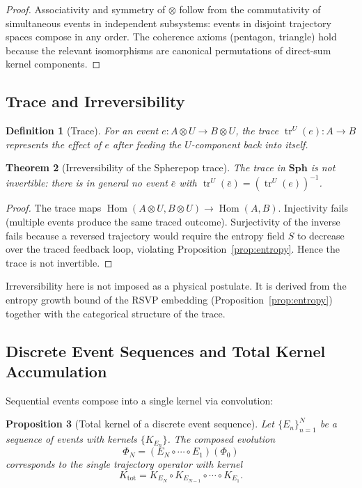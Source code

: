 \documentclass[12pt]{article}
\newtheorem{theorem}{Theorem}[section]
\newtheorem{proposition}[theorem]{Proposition}
\newtheorem{definition}[theorem]{Definition}
\DeclareMathOperator{\Hom}{Hom}
\DeclareMathOperator{\tr}{tr}
\begin{document}
\begin{proof}
Associativity and symmetry of $\otimes$ follow from the commutativity of
simultaneous events in independent subsystems: events in disjoint trajectory
spaces compose in any order. The coherence axioms (pentagon, triangle) hold
because the relevant isomorphisms are canonical permutations of direct-sum
kernel components.
\end{proof}

\subsection{Trace and Irreversibility}

\begin{definition}[Trace]
For an event $e \colon A\otimes U \to B\otimes U$, the trace
$\tr^U(e) \colon A \to B$ represents the effect of $e$ after feeding
the $U$-component back into itself.
\end{definition}

\begin{theorem}[Irreversibility of the Spherepop trace]
\label{thm:irrev}
The trace in $\mathbf{Sph}$ is not invertible: there is in general no
event $\bar{e}$ with $\tr^U(\bar{e}) = (\tr^U(e))^{-1}$.
\end{theorem}

\begin{proof}
The trace maps $\Hom(A\otimes U, B\otimes U) \to \Hom(A,B)$. Injectivity
fails (multiple events produce the same traced outcome). Surjectivity of
the inverse fails because a reversed trajectory would require the entropy
field $S$ to decrease over the traced feedback loop, violating
Proposition~\ref{prop:entropy}. Hence the trace is not invertible.
\end{proof}

Irreversibility here is not imposed as a physical postulate. It is derived
from the entropy growth bound of the RSVP embedding (Proposition~\ref{prop:entropy})
together with the categorical structure of the trace.

\subsection{Discrete Event Sequences and Total Kernel Accumulation}

Sequential events compose into a single kernel via convolution:

\begin{proposition}[Total kernel of a discrete event sequence]
\label{prop:totalkernel}
Let $\{E_n\}_{n=1}^N$ be a sequence of events with kernels
$\{K_{E_n}\}$. The composed evolution
\[
  \Phi_N = (E_N \circ \cdots \circ E_1)(\Phi_0)
\]
corresponds to the single trajectory operator with kernel
\[
  K_{\mathrm{tot}} = K_{E_N} \circ K_{E_{N-1}} \circ \cdots \circ K_{E_1}.
\]
\end{proposition}
\end{document}

